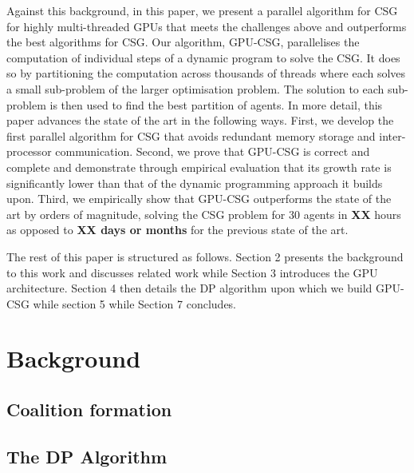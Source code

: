 \documentclass{llncs}
\begin{document}
Against this background, in this paper, we present a parallel algorithm for CSG for highly multi-threaded GPUs that meets the challenges above and outperforms the best algorithms for CSG. Our algorithm, GPU-CSG, parallelises the computation of individual steps of a dynamic program to solve the CSG. It does so by partitioning the computation across thousands of threads where each solves a small sub-problem of the larger optimisation problem. The solution to each sub-problem is then used to find the best partition of agents. In more detail, this paper advances the state of the art in the following ways. First, we develop the first parallel  algorithm for CSG that avoids redundant memory storage and inter-processor communication. Second, we prove that GPU-CSG is correct and complete and demonstrate through empirical evaluation that its growth rate is significantly lower than that of the dynamic programming approach it builds upon. Third, we empirically show that GPU-CSG outperforms the state of the art by orders of magnitude, solving the CSG problem for 30 agents in \textbf{XX} hours as opposed to \textbf{XX days or months} for the previous state of the art.

The rest of this paper is structured as follows. Section 2 presents the
background to this work and discusses related work while Section 3 introduces
the GPU architecture. Section 4 then details the DP algorithm upon which we build GPU-CSG
while section 5 while Section 7 concludes.

\section{Background}

\subsection{Coalition formation}


\subsection{The {DP} Algorithm} 
\end{document}
